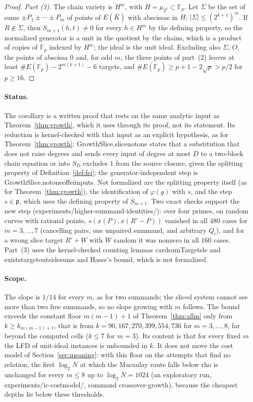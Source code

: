 \documentclass[11pt]{article}
\theoremstyle{definition}\newtheorem{definition}[theorem]{Definition}
\theoremstyle{remark}\newtheorem{remark}[theorem]{Remark}
\newcommand{\F}{\mathbb F}
\newcommand{\codeus}{\textunderscore\allowbreak}
\newcommand{\code}[1]{{\ttfamily\let\_\codeus#1}}
\begin{document}
\begin{proof}
\emph{Part (3).} The chain variety is $H^m$, with $H=\mu_{2^k}\subset\F_p$.
Let $\Sigma$ be the set of sums $\pm P_1\pm\cdots\pm P_m$ of points of
$E(\bar K)$ with abscissae in $H$; $|\Sigma|\le(2^{k+1})^m$. If $R\notin
\Sigma$, then $S_{m+1}(h,t)\ne0$ for every $h\in H^m$ by the defining
property, so the normalized generator is a unit in the quotient by the
chains, which is a product of copies of $\F_p$ indexed by $H^m$; the ideal
is the unit ideal. Excluding also $\Sigma$, $O$, the points of abscissa $0$
and, for odd $m$, the three points of part~(2) leaves at least
$\#E(\F_p)-2^{m(k+1)}-6$ targets, and $\#E(\F_p)\ge p+1-2\sqrt p>p/2$ for
$p\ge16$.
\end{proof}

\paragraph{Status.} The corollary is a written proof that rests on the same
analytic input as Theorem~\ref{thm:growth}, which it uses through its
proof, not its statement. Its reduction is kernel-checked with that input
as an explicit hypothesis, as for Theorem~\ref{thm:growth}:
\code{GrowthSlice.slice\_not\_one} states that a substitution that does not
raise degrees and sends every input of degree at most $D$ to a two-block
chain equation or into $S_D$ excludes $1$ from the source closure, given the
splitting property of Definition~\ref{def:fei}; the generator-independent
step is \code{GrowthSlice.not\_one\_of\_fei\_inputs}. Not formalized are the
splitting property itself (as for Theorem~\ref{thm:growth}), the
identification of $\varphi(g)$ with $s$, and the step $s\in\mathfrak p$,
which uses the defining property of $S_{m+1}$. Two exact
checks support the new step (\code{experiments/higher-summand-identities/}):
over four primes, on random curves with rational points, $s(x(P),x(R'-P))$
vanished in all $480$ cases for $m=3,\ldots,7$ (cancelling pairs, one
unpaired summand, and arbitrary $Q_i$), and for a wrong slice target
$R'+W$ with $W$ random it was nonzero in all $160$ cases. Part~(3) uses the
kernel-checked counting lemmas \code{card\_sumTargets\_le} and
\code{exists\_target\_outside\_sums} and Hasse's bound, which is not
formalized.

\paragraph{Scope.} The slope is $1/14$ for every $m$, as for two summands;
the sliced system cannot see more than two free summands, so no slope
growing with $m$ follows. The bound exceeds the constant floor
$m(m-1)+1$ of Theorem~\ref{thm:allm} only from $k\ge k_{m(m-1)+1}$, that is
from $k=90,167,270,399,554,736$ for $m=3,\ldots,8$, far beyond the
computed cells ($k\le7$ for $m=3$). Its content is that for every fixed
$m$ the LFD of unit-ideal instances is unbounded in $k$. It does not move
the cost model of Section~\ref{sec:meaning}: with this floor on the
attempts that find no relation, the first $\log_2N$ at which the Macaulay
route falls below rho is unchanged for every $m\le8$ up to $\log_2N=1024$
(an exploratory run, \code{experiments/ic-costmodel/}, command
\code{crossover-growth}), because the cheapest depths lie below these
thresholds.
\end{document}
